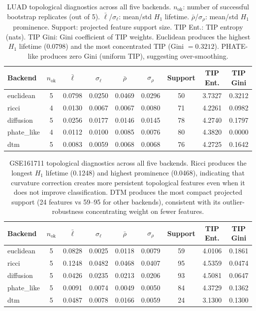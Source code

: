 \documentclass[11pt]{article}
\begin{document}
\begin{table}[h]
\centering
\small
\begin{tabular}{lcccccccc}
\toprule
Backend & $n_{\text{ok}}$ & $\bar{\ell}$ & $\sigma_\ell$ & $\bar{\rho}$ & $\sigma_\rho$ & Support & TIP Ent. & TIP Gini \\
\midrule
euclidean & 5 & 0.0798 & 0.0250 & 0.0469 & 0.0296 & 50 & 3.7327 & 0.3212 \\
ricci & 4 & 0.0130 & 0.0067 & 0.0067 & 0.0080 & 71 & 4.2261 & 0.0982 \\
diffusion & 5 & 0.0256 & 0.0177 & 0.0146 & 0.0145 & 78 & 4.2740 & 0.1797 \\
phate\_like & 4 & 0.0112 & 0.0100 & 0.0085 & 0.0076 & 80 & 4.3820 & 0.0000 \\
dtm & 5 & 0.0083 & 0.0059 & 0.0068 & 0.0068 & 76 & 4.2725 & 0.1642 \\
\bottomrule
\end{tabular}
\caption{LUAD topological diagnostics across all five backends.
$n_{\text{ok}}$: number of successful bootstrap replicates (out of 5).
$\bar{\ell}$/$\sigma_\ell$: mean/std $H_1$ lifetime.
$\bar{\rho}$/$\sigma_\rho$: mean/std $H_1$ prominence.
Support: projected feature support size.
TIP Ent.: TIP entropy (nats).
TIP Gini: Gini coefficient of TIP weights.
Euclidean produces the highest $H_1$ lifetime (0.0798) and the most concentrated TIP (Gini $= 0.3212$).
PHATE-like produces zero Gini (uniform TIP), suggesting over-smoothing.}
\label{tab:diag_luad}
\end{table}

\begin{table}[h]
\centering
\small
\begin{tabular}{lcccccccc}
\toprule
Backend & $n_{\text{ok}}$ & $\bar{\ell}$ & $\sigma_\ell$ & $\bar{\rho}$ & $\sigma_\rho$ & Support & TIP Ent. & TIP Gini \\
\midrule
euclidean & 5 & 0.0828 & 0.0025 & 0.0118 & 0.0079 & 59 & 4.0106 & 0.1861 \\
ricci & 5 & 0.1248 & 0.0482 & 0.0468 & 0.0407 & 95 & 4.5359 & 0.0474 \\
diffusion & 5 & 0.0426 & 0.0235 & 0.0213 & 0.0206 & 93 & 4.5081 & 0.0647 \\
phate\_like & 5 & 0.0091 & 0.0074 & 0.0049 & 0.0050 & 84 & 4.3729 & 0.1362 \\
dtm & 5 & 0.0487 & 0.0078 & 0.0166 & 0.0059 & 24 & 3.1300 & 0.1300 \\
\bottomrule
\end{tabular}
\caption{GSE161711 topological diagnostics across all five backends.
Ricci produces the longest $H_1$ lifetime (0.1248) and highest prominence (0.0468), indicating that curvature correction creates more persistent topological features even when it does not improve classification.
DTM produces the most compact projected support (24 features vs 59--95 for other backends), consistent with its outlier-robustness concentrating weight on fewer features.}
\label{tab:diag_gse}
\end{table}
\end{document}
